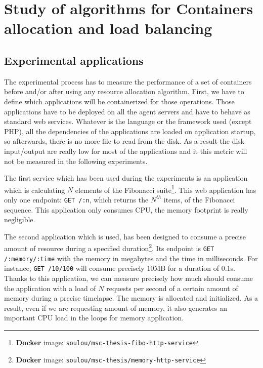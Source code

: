 \chapter{Study of algorithms for Containers allocation and load balancing}
\label{chapt:containerloadbalance}

\section{Experimental applications}

The experimental process has to measure the performance of a set of containers
before and/or after using any resource allocation algorithm. First, we have to
define which applications will be containerized for those operations. Those
applications have to be deployed on all the agent servers and have to behave as
standard web services. Whatever is the language or the framework used (except
PHP), all the dependencies of the applications are loaded on application
startup, so afterwards, there is no more file to read from the disk.  As a
result the disk input/output are really low for most of the applications and it
this metric will not be measured in the following experiments.

The first service which has been used during the experiments is an application which
is calculating $N$ elements of the Fibonacci suite\footnote{\textbf{Docker}
image: \texttt{soulou/msc-thesis-fibo-http-service}}. This web application has
only one endpoint: \texttt{GET /:n}, which returns the $N^{th}$ items, of the
Fibonacci sequence. This application only consumes CPU, the memory footprint is
really negligible.

The second application which is used, has been designed to consume a precise
amount of resource during a specified duration\footnote{\textbf{Docker} image:
\texttt{soulou/msc-thesis/memory-http-service}}. Its endpoint is \texttt{GET
/:memory/:time} with the memory in megabytes and the time in milliseconds. For
instance, \texttt{GET /10/100} will consume precisely 10MB for a duration of
0.1s. Thanks to this application, we can measure precisely how much should
consume the application with a load of $N$ requests per second of a certain
amount of memory during a precise timelapse.
The memory is allocated and initialized. As a result, even if we are requesting
amount of memory, it also generates an important CPU load in the loops for memory
application.

